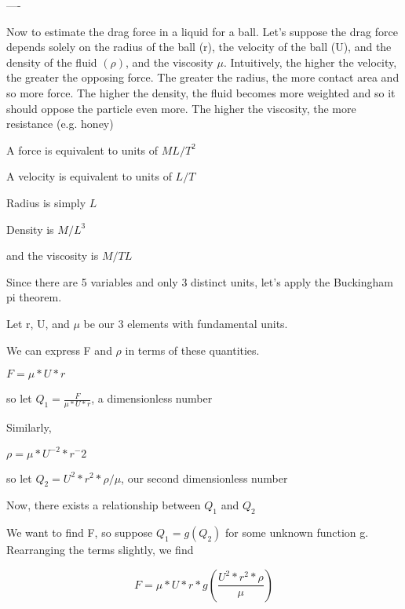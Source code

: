 \documentclass{article}
\begin{document}
----

Now to estimate the drag force in a liquid for a ball. Let's suppose the drag force depends solely on the radius of the ball (r), the velocity of the ball (U), and the density of the fluid $(\rho)$, and the viscosity $\mu$. Intuitively, the higher the velocity, the greater the opposing force. The greater the radius, the more contact area and so more force. The higher the density, the fluid becomes more weighted and so it should oppose the particle even more. The higher the viscosity, the more resistance (e.g. honey)


A force is equivalent to units of $ML/T^2$
 
A velocity is equivalent to units of $L/T$

Radius is simply $L$

Density is $M/L^3$

and the viscosity is $M/TL$

Since there are 5 variables and only 3 distinct units, let's apply the Buckingham pi theorem.

Let r, U, and $\mu$ be our 3 elements with fundamental units. 

We can express F and $\rho$ in terms of these quantities. 

$F = \mu * U * r$

so let $Q_1 =  \frac{F}{\mu * U * r}$, a dimensionless number

Similarly, 

$\rho = \mu * U^{-2} * r^-2$

so let $Q_2 = U^2 *r^2*\rho/\mu$, our second dimensionless number

Now, there exists a relationship between $Q_1$ and $Q_2$

We want to find F, so suppose $Q_1 = g(Q_2)$ for some unknown function g. Rearranging the terms slightly, we find

$$F = \mu * U * r * g(\frac{U^2 *r^2*\rho}{\mu})$$
\end{document}
